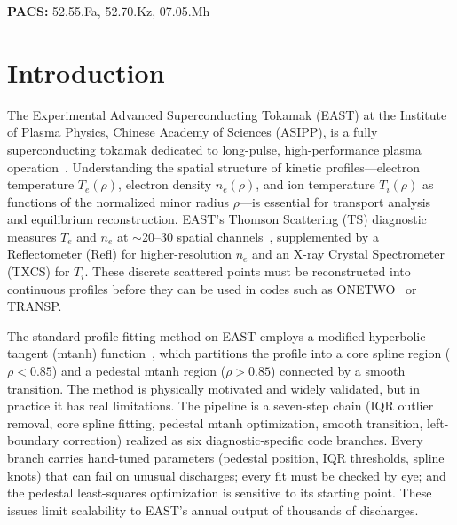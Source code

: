 \documentclass[a4paper,12pt]{article}
\begin{document}
\noindent\textbf{PACS:} 52.55.Fa, 52.70.Kz, 07.05.Mh

\section{Introduction}

The Experimental Advanced Superconducting Tokamak (EAST) at the Institute of Plasma Physics, Chinese Academy of Sciences (ASIPP), is a fully superconducting tokamak dedicated to long-pulse, high-performance plasma operation~\cite{east_overview}. Understanding the spatial structure of kinetic profiles---electron temperature $T_e(\rho)$, electron density $n_e(\rho)$, and ion temperature $T_i(\rho)$ as functions of the normalized minor radius $\rho$---is essential for transport analysis and equilibrium reconstruction. EAST's Thomson Scattering (TS) diagnostic measures $T_e$ and $n_e$ at $\sim$20--30 spatial channels~\cite{east_ts,east_tvts}, supplemented by a Reflectometer (Refl) for higher-resolution $n_e$ and an X-ray Crystal Spectrometer (TXCS) for $T_i$. These discrete scattered points must be reconstructed into continuous profiles before they can be used in codes such as ONETWO~\cite{onetwo} or TRANSP.

The standard profile fitting method on EAST employs a modified hyperbolic tangent (mtanh) function~\cite{mtanh_groebner}, which partitions the profile into a core spline region ($\rho < 0.85$) and a pedestal mtanh region ($\rho > 0.85$) connected by a smooth transition. The method is physically motivated and widely validated, but in practice it has real limitations. The pipeline is a seven-step chain (IQR outlier removal, core spline fitting, pedestal mtanh optimization, smooth transition, left-boundary correction) realized as six diagnostic-specific code branches. Every branch carries hand-tuned parameters (pedestal position, IQR thresholds, spline knots) that can fail on unusual discharges; every fit must be checked by eye; and the pedestal least-squares optimization is sensitive to its starting point. These issues limit scalability to EAST's annual output of thousands of discharges.
\end{document}
